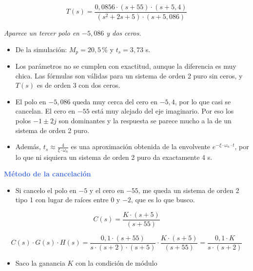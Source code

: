 \documentclass[10pt]{article}
\begin{document}
\[
T(s) = \frac{0{,}0856 \cdot (s + 55) \cdot (s + 5{,}4)}{(s^2 + 2s + 5) \cdot (s + 5{,}086)}
\]

\textit{Aparece un tercer polo en $-5{,}086$ y dos ceros.}


\begin{itemize}
    \item De la simulación: $M_p = 20{,}5$\,\% y $t_s = 3{,}73$ s.
    \item Los parámetros no se cumplen con exactitud, aunque la diferencia es muy chica. Las fórmulas son válidas para un sistema de orden 2 puro sin ceros, y $T(s)$ es de orden 3 con dos ceros.
    \item El polo en $-5{,}086$ queda muy cerca del cero en $-5{,}4$, por lo que casi se cancelan. El cero en $-55$ está muy alejado del eje imaginario. Por eso los polos $-1 \pm 2j$ son dominantes y la respuesta se parece mucho a la de un sistema de orden 2 puro.
    \item Además, $t_s \approx \frac{4}{\xi \cdot \omega_n}$ es una aproximación obtenida de la envolvente $e^{-\xi \cdot \omega_n \cdot t}$, por lo que ni siquiera un sistema de orden 2 puro da exactamente 4 s.
\end{itemize}
\vspace{0.4cm}

\hspace{0.2cm} \textbf{\textcolor{RoyalBlue}{Método de la cancelación}}

\begin{itemize}
    \item Si cancelo el polo en $-5$ y el cero en $-55$, me queda un sistema de orden 2 tipo 1 con lugar de raíces entre $0$ y $-2$, que es lo que busco.
\end{itemize}

\[
C(s) = \frac{K \cdot (s + 5)}{(s + 55)}
\]

\[
C(s) \cdot G(s) \cdot H(s) = \frac{0{,}1 \cdot (s + 55)}{s \cdot (s + 2) \cdot (s + 5)} \cdot \frac{K \cdot (s + 5)}{(s + 55)} = \frac{0{,}1 \cdot K}{s \cdot (s + 2)}
\]

\begin{itemize}
    \item Saco la ganancia $K$ con la condición de módulo
\end{itemize}
\end{document}
